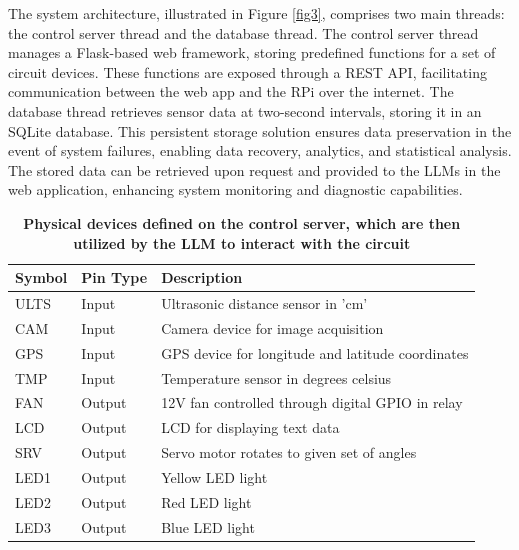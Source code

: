 \documentclass{ieeeaccess}
\begin{document}
The system architecture, illustrated in Figure  \ref{fig3}, comprises two main threads: the control server thread and the database thread. The control server thread manages a Flask-based web framework, storing predefined functions for a set of circuit devices. These functions are exposed through a REST API, facilitating communication between the web app and the RPi over the internet. The database thread retrieves sensor data at two-second intervals, storing it in an SQLite database. This persistent storage solution ensures data preservation in the event of system failures, enabling data recovery, analytics, and statistical analysis. The stored data can be retrieved upon request and provided to the LLMs in the web application, enhancing system monitoring and diagnostic capabilities.

\begin{table}[!h]
    \caption{\textbf{Physical devices defined on the control server, which are then utilized by the LLM to interact with the circuit}}
    \label{table1}
    \setlength{\tabcolsep}{3pt}
    \begin{tabular}{|p{30pt}|p{32pt}|p{165pt}|}
        \hline
        \textbf{Symbol} &
        \textbf{Pin Type}   &
        \textbf{Description}                                             \\
        \hline
        ULTS   &
        Input  &
        Ultrasonic distance sensor in 'cm'                      \\
        \hline
        CAM    &
        Input  &
        Camera device for image acquisition                       \\
        \hline
        GPS    &
        Input  &
        GPS device for longitude and latitude coordinates       \\
        \hline
        TMP    &
        Input  &
        Temperature sensor in degrees celsius    \\
        \hline
        FAN    &
        Output &
        12V fan controlled through digital GPIO in relay \\
        \hline
        LCD    &
        Output &
        LCD for displaying text data                          \\
        \hline
        SRV    &
        Output &
        Servo motor rotates to given set of angles         \\
        \hline
        LED1   &
        Output &
        Yellow LED light                                        \\
        \hline
        LED2   &
        Output &
        Red LED light                                           \\
        \hline
        LED3   &
        Output &
        Blue LED light                                          \\
        \hline
    \end{tabular}
\end{table}
\end{document}
